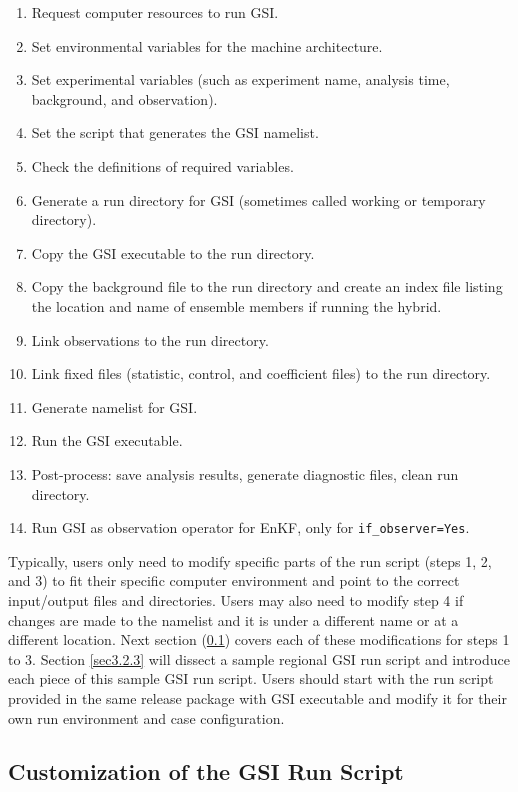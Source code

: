 \begin{enumerate}
\item Request computer resources to run GSI.
\item Set environmental variables for the machine architecture.
\item Set experimental variables (such as experiment name, analysis time, background, and observation).
\item Set the script that generates the GSI namelist.
\item Check the definitions of required variables. 
\item Generate a run directory for GSI  (sometimes called working or temporary directory).
\item Copy the GSI executable to the run directory.
\item Copy the background file to the run directory and create an index file listing the location and name of ensemble members if running the hybrid.
\item Link observations to the run directory.
\item Link fixed files (statistic, control, and coefficient files) to the run directory. 
\item Generate namelist for GSI.
\item Run the GSI executable.
\item Post-process: save analysis results, generate diagnostic files, clean run directory.
\item Run GSI as observation operator for EnKF, only for \verb|if_observer=Yes|.
\end{enumerate}

Typically, users only need to modify specific parts of the run script (steps 1, 2, and 3) to fit their specific computer environment and point to the correct input/output files and directories. Users may also need to modify step 4 if changes are made to the namelist and it is under a different name or at a different location. Next section (\ref{sec3.2.2}) covers each of these modifications for steps 1 to 3. Section \ref{sec3.2.3} will dissect a sample regional GSI run script and introduce each piece of this sample GSI run script. Users should start with the run script provided in the same release package with GSI executable and modify it for their own run environment and case configuration.


\subsection{Customization of the GSI Run Script}
\label{sec3.2.2}

